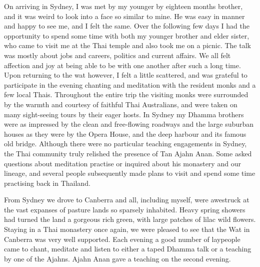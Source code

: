 On arriving in Sydney, I was met by my younger by eighteen months
brother, and it was weird to look into a face so similar to mine. He was
easy in manner and happy to see me, and I felt the same. Over the
following few days I had the opportunity to spend some time with both my
younger brother and elder sister, who came to visit me at the Thai
temple and also took me on a picnic. The talk was mostly about jobs and
careers, politics and current affairs. We all felt affection and joy at
being able to be with one another after such a long time. Upon returning
to the wat however, I felt a little scattered, and was grateful to
participate in the evening chanting and meditation with the resident
monks and a few local Thais. Throughout the entire trip the visiting
monks were surrounded by the warmth and courtesy of faithful Thai
Australians, and were taken on many sight-seeing tours by their eager
hosts. In Sydney my Dhamma brothers were as impressed by the clean and
free-flowing roadways and the large suburban houses as they were by the
Opera House, and the deep harbour and its famous old bridge. Although
there were no particular teaching engagements in Sydney, the Thai
community truly relished the presence of Tan Ajahn Anan. Some asked
questions about meditation practise or inquired about his monastery and
our lineage, and several people subsequently made plans to visit and
spend some time practising back in Thailand. 

From Sydney we drove to Canberra and all, including myself, were
awestruck at the vast expanses of pasture lands so sparsely inhabited. 
Heavy spring showers had turned the land a gorgeous rich green, with
large patches of lilac wild flowers. Staying in a Thai monastery once
again, we were pleased to see that the Wat in Canberra was very well
supported. Each evening a good number of laypeople came to chant, 
meditate and listen to either a taped Dhamma talk or a teaching by one
of the Ajahns. Ajahn Anan gave a teaching on the second evening. 

